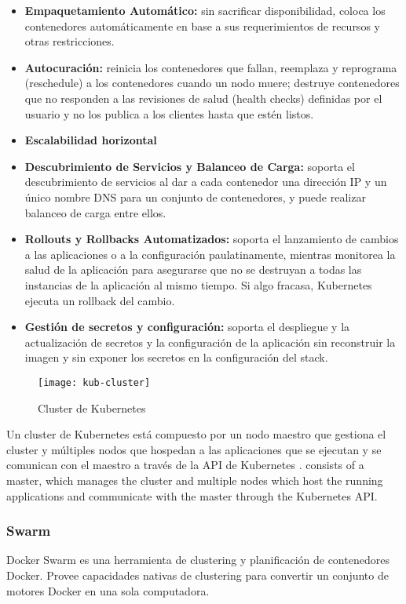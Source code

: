 \begin{itemize}

\item \textbf{Empaquetamiento Automático: }sin sacrificar disponibilidad, coloca los contenedores automáticamente en base a sus requerimientos de recursos y otras restricciones.
\item \textbf{Autocuración: }reinicia los contenedores que fallan, reemplaza y reprograma (reschedule) a los contenedores cuando un nodo muere; destruye contenedores que no responden a las revisiones de salud (health checks) definidas por el usuario y no los publica a los clientes hasta que estén listos.
\item \textbf{Escalabilidad horizontal}
\item \textbf{Descubrimiento de Servicios y Balanceo de Carga: }soporta el descubrimiento de servicios al dar a cada contenedor una dirección IP y un único nombre DNS para un conjunto de contenedores, y puede realizar balanceo de carga entre ellos.
\item \textbf{Rollouts y Rollbacks Automatizados: }soporta el lanzamiento de cambios a las aplicaciones o a la configuración paulatinamente, mientras monitorea la salud de la aplicación para asegurarse que no se destruyan a todas las instancias de la aplicación al mismo tiempo. Si algo fracasa, Kubernetes ejecuta un rollback del cambio.
\item \textbf{Gestión de secretos y configuración: }soporta el despliegue y la actualización de secretos y la configuración de la aplicación sin reconstruir la imagen y sin exponer los secretos en la configuración del stack.

\end{itemize}

\begin{figure}[H]
    \centering
    \texttt{[image: kub-cluster]}
    \caption{ Cluster de Kubernetes \protect\cite{Kubernetes2016-jo}}
    \label{fig:kub-cluster}
\end{figure}

Un cluster de Kubernetes está compuesto por un nodo maestro que gestiona el cluster y múltiples nodos que hospedan a las aplicaciones que se ejecutan y se comunican con el maestro a través de la API de Kubernetes \cite{Kubernetes2016-jo}.
consists of a master, which manages the cluster and multiple nodes which host the running applications and communicate with the master through the Kubernetes API.


\subsubsection{Swarm}
Docker Swarm \cite{Docker2016-yo} es una herramienta de clustering y planificación de contenedores Docker. Provee capacidades nativas de clustering para convertir un conjunto de motores Docker en una sola computadora.

